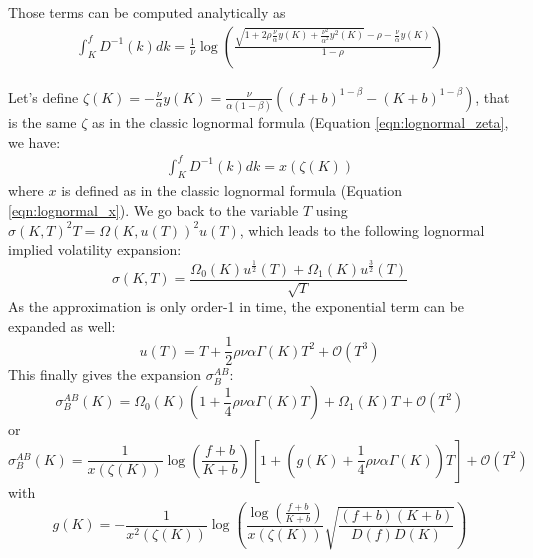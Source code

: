 \documentclass[]{rAMF2e}
\begin{document}
Those terms can be computed analytically as
\begin{align}
\int_K^f D^{-1}(k)dk = \frac{1}{\nu}\log\left(\frac{\sqrt{1 +2 \rho\frac{\nu}{\alpha} y(K) + \frac{\nu^2}{\alpha^2} y^2(K)}-\rho -\frac{\nu}{\alpha} y(K)}{1-\rho} \right)
\end{align}

Let's define $\zeta(K) = -\frac{\nu}{\alpha} y(K) = \frac{\nu}{\alpha(1-\beta)}\left( (f+b)^{1-\beta}-(K+b)^{1-\beta}\right)$, that is the same $\zeta$ as in the classic lognormal formula  (Equation \ref{eqn:lognormal_zeta}, we have:
\begin{align}
\int_K^f D^{-1}(k)dk = x(\zeta(K))
\end{align}
where $x$ is defined as in the classic lognormal formula (Equation \ref{eqn:lognormal_x}).
We go back to the variable $T$ using $\sigma(K,T)^2 T = \Omega(K,u(T))^2 u(T)$, which leads to the following lognormal implied volatility expansion:
\begin{equation}
\sigma(K,T) = \frac{\Omega_0(K) u^{\frac{1}{2}}(T) + \Omega_1(K) u^{\frac{3}{2}}(T)}{\sqrt{T}}
\end{equation}
As the approximation is only order-1 in time, the exponential term can be expanded as well:
\begin{equation}
u(T) = T + \frac{1}{2}\rho\nu\alpha\Gamma(K)T^2 + \mathcal{O}(T^3)
\end{equation}
This finally gives the expansion $\sigma_B^{AB}$:
\begin{equation}\label{eqn:lognormal_ab}
\sigma_B^{AB}(K) = \Omega_0(K) \left(1+\frac{1}{4}\rho\nu\alpha\Gamma(K)T\right) + \Omega_1(K) T + \mathcal{O}(T^2)
\end{equation}
or 
\begin{equation}\label{eqn:lognormal_ab}
\sigma_B^{AB}(K) =  \frac{1}{x(\zeta(K))}\log\left(\frac{f+b}{K+b}\right)\left[1+ \left(g(K)+\frac{1}{4}\rho\nu\alpha\Gamma(K) \right)T\right]+ \mathcal{O}(T^2)
\end{equation}
with 
\begin{equation*}
g(K) =  - \frac{1}{x^2(\zeta(K))}\log\left(\frac{\log\left(\frac{f+b}{K+b}\right)}{x(\zeta(K))}\sqrt{\frac{(f+b) (K+b)}{D(f)D(K)}}\right)
\end{equation*}
\end{document}
